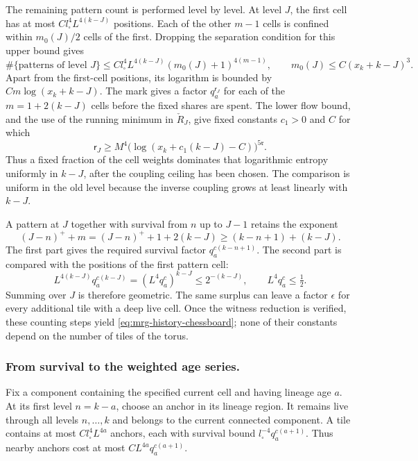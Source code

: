 \documentclass[11pt,letterpaper,reqno]{amsart}
\theoremstyle{definition}
\theoremstyle{remark}
\begin{document}
The remaining pattern count is performed level by level. At
level $J$, the first cell has at most
$Cl_\square^4L^{4(k-J)}$ positions. Each of the other $m-1$
cells is confined within $m_0(J)/2$ cells of the first. Dropping
the separation condition for this upper bound gives
\begin{equation}\label{eq:history-pattern-count}
 \#\{\text{patterns of level }J\}
       \le Cl_\square^4L^{4(k-J)}
                        (m_0(J)+1)^{4(m-1)},
       \qquad m_0(J)\le C(x_k+k-J)^3.
\end{equation}
Apart from the first-cell positions, its logarithm is bounded by
$Cm\log(x_k+k-J)$. The mark gives a factor
$q_a^{\mathsf r_J}$ for each of the $m=1+2(k-J)$ cells before
the fixed shares are spent. The lower flow bound, and the use of
the running minimum in $\check R_J$, give fixed constants
$c_1>0$ and $C$ for which
\[
 \mathsf r_J\ge
 M^4\big(\log(x_k+c_1(k-J)-C)\big)^{5\mathfrak r}.
\]
Thus a fixed fraction of the cell weights dominates that logarithmic
entropy uniformly in $k-J$, after the coupling ceiling has been
chosen. The comparison is uniform in the old level because the
inverse coupling grows at least linearly with $k-J$.

A pattern at $J$ together with survival from $n$ up to $J-1$
retains the exponent
\[
 (J-n)^++m=(J-n)^++1+2(k-J)
                    \ge(k-n+1)+(k-J).
\]
The first part gives the required survival factor
$q_a^{c(k-n+1)}$. The second part is compared with the positions
of the first pattern cell:
\[
 L^{4(k-J)}q_a^{c(k-J)}
      =(L^4q_a^c)^{k-J}\le2^{-(k-J)},
 \qquad L^4q_a^c\le\tfrac12.
\]
Summing over $J$ is therefore geometric. The same surplus can
leave a factor $\epsilon$ for every additional tile with a deep
live cell. Once the witness reduction is verified, these counting steps yield
\eqref{eq:mrg-history-chessboard}; none of their constants depend
on the number of tiles of the torus.

\subsubsection*{From survival to the weighted age series.}

Fix a component containing the specified current cell and having
lineage age $a$. At its first level $n=k-a$, choose an anchor
in its lineage region. It remains live through all levels
$n,\ldots,k$ and belongs to the current connected component.
A tile contains at most $Cl_\square^4L^{4a}$ anchors, each with
survival bound $l_\square^{-4}q_a^{c(a+1)}$. Thus nearby anchors
cost at most $CL^{4a}q_a^{c(a+1)}$.
\end{document}

